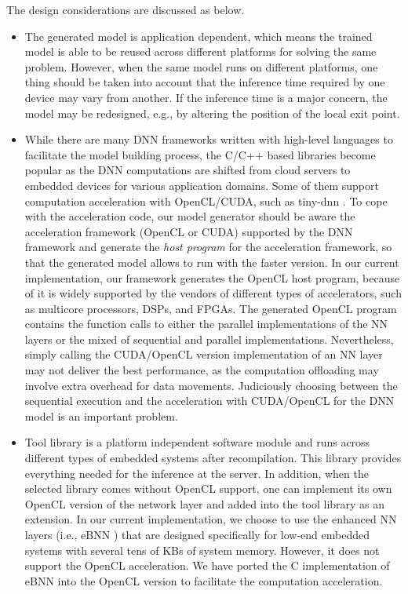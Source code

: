 \documentclass[format=acmsmall, review=false, screen=true]{acmart}
\begin{document}
The design considerations are discussed as below.
\begin{itemize}
  \item The generated model is application dependent, which means the trained model is able to be reused across different platforms for solving the same problem. However, when the same model runs on different platforms, one thing should be taken into account that the inference time required by one device may vary from another. If the inference time is a major concern, the model may be redesigned, e.g., by altering the position of the local exit point.
  \item While there are many DNN frameworks written with high-level languages to facilitate the model building process, the C/C++ based libraries \cite{tinydnn,McDanel17} become popular as the DNN computations are shifted from cloud servers to embedded devices for various application domains. Some of them support computation acceleration with OpenCL/CUDA, such as tiny-dnn \cite{tinydnn}. To cope with the acceleration code, our model generator should be aware the acceleration framework (OpenCL or CUDA) supported by the DNN framework and generate the \emph{host program} for the acceleration framework, so that the generated model allows to run with the faster version. In our current implementation, our framework generates the OpenCL host program, because of it is widely supported by the vendors of different types of accelerators, such as multicore processors, DSPs, and FPGAs. The generated OpenCL program contains the function calls to either the parallel implementations of the NN layers or the mixed of sequential and parallel implementations.
      Nevertheless, simply calling the CUDA/OpenCL version implementation of an NN layer may not deliver the best performance, as the computation offloading may involve extra overhead for data movements. Judiciously choosing between the sequential execution and the acceleration with CUDA/OpenCL for the DNN model is an important problem.
  \item Tool library is a platform independent software module and runs across different types of embedded systems after recompilation. This library provides everything needed for the inference at the server. In addition, when the selected library comes without OpenCL support, one can implement its own OpenCL version of the network layer and added into the tool library as an extension. In our current implementation, we choose to use the enhanced NN layers (i.e., eBNN \cite{McDanel17}) that are designed specifically for low-end embedded systems with several tens of KBs of system memory. However, it does not support the OpenCL acceleration. We have ported the C implementation of eBNN into the OpenCL version to facilitate the computation acceleration.
\end{itemize}
\end{document}
